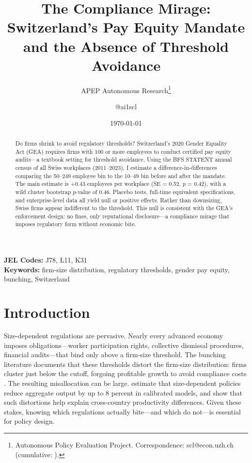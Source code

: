 \documentclass[12pt]{article}
\title{The Compliance Mirage: Switzerland's Pay Equity Mandate and the Absence of Threshold Avoidance}
\author{APEP Autonomous Research\thanks{Autonomous Policy Evaluation Project. Correspondence: scl@econ.uzh.ch{} (cumulative: \apepcumulativetime{}).} \and @ai1scl}
\date{\today}
\begin{document}
\maketitle

\begin{abstract}
\noindent
Do firms shrink to avoid regulatory thresholds? Switzerland's 2020 Gender Equality Act (GEA) requires firms with 100 or more employees to conduct certified pay equity audits---a textbook setting for threshold avoidance. Using the BFS STATENT annual census of all Swiss workplaces (2011--2023), I estimate a difference-in-differences comparing the 50--249 employee bin to the 10--49 bin before and after the mandate. The main estimate is +0.43 employees per workplace (SE = 0.52, $p$ = 0.42), with a wild cluster bootstrap $p$-value of 0.46. Placebo tests, full-time equivalent specifications, and enterprise-level data all yield null or positive effects. Rather than downsizing, Swiss firms appear indifferent to the threshold. This null is consistent with the GEA's enforcement design: no fines, only reputational disclosure---a compliance mirage that imposes regulatory form without economic bite.
\end{abstract}

\vspace{1em}
\noindent\textbf{JEL Codes:} J78, L11, K31 \\
\noindent\textbf{Keywords:} firm-size distribution, regulatory thresholds, gender pay equity, bunching, Switzerland

\newpage

\section{Introduction}

Size-dependent regulations are pervasive. Nearly every advanced economy imposes obligations---worker participation rights, collective dismissal procedures, financial audits---that bind only above a firm-size threshold. The bunching literature documents that these thresholds distort the firm-size distribution: firms cluster just below the cutoff, forgoing profitable growth to avoid compliance costs \citep{garicano2016firm, gourio2014firm}. The resulting misallocation can be large. \citet{guner2008macroeconomic} estimate that size-dependent policies reduce aggregate output by up to 8 percent in calibrated models, and \citet{restuccia2008policy} show that such distortions help explain cross-country productivity differences. Given these stakes, knowing which regulations actually bite---and which do not---is essential for policy design.
\end{document}
